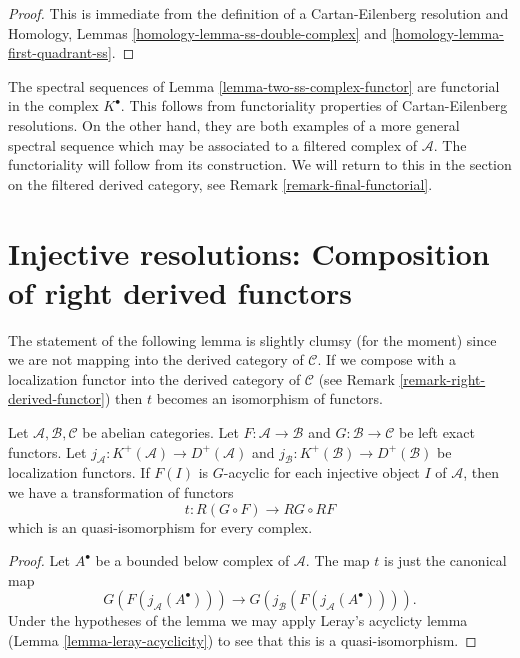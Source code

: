 \begin{proof}
This is immediate from the definition of a Cartan-Eilenberg resolution and
Homology, Lemmas \ref{homology-lemma-ss-double-complex} and
\ref{homology-lemma-first-quadrant-ss}.
\end{proof}

\begin{remark}
\label{remark-functorial-ss}
The spectral sequences of Lemma \ref{lemma-two-ss-complex-functor}
are functorial in the complex $K^\bullet$. This follows from functoriality
properties of Cartan-Eilenberg resolutions. On the other hand, they are
both examples of a more general spectral sequence which may be associated
to a filtered complex of $\mathcal{A}$. The functoriality will follow from
its construction. We will return to this in the section on the filtered
derived category, see Remark \ref{remark-final-functorial}.
\end{remark}










\section{Injective resolutions: Composition of right derived functors}
\label{section-composition-right-derived-functors}

\noindent
The statement of the following lemma is slightly clumsy (for the moment)
since we are not mapping into the derived category of $\mathcal{C}$.
If we compose with a localization functor into the derived category
of $\mathcal{C}$ (see Remark \ref{remark-right-derived-functor})
then $t$ becomes an isomorphism of functors.

\begin{lemma}
\label{lemma-compose-derived-functors}
Let $\mathcal{A}, \mathcal{B}, \mathcal{C}$ be abelian categories.
Let $F : \mathcal{A} \to \mathcal{B}$
and $G : \mathcal{B} \to \mathcal{C}$ be left exact functors.
Let $j_{\mathcal{A}} : K^{+}(\mathcal{A}) \to D^{+}(\mathcal{A})$ and
$j_{\mathcal{B}} : K^{+}(\mathcal{B}) \to D^{+}(\mathcal{B})$ be
localization functors. If $F(I)$ is $G$-acyclic for each injective object $I$
of $\mathcal{A}$, then we have a transformation of functors
$$
t : R(G \circ F) \longrightarrow RG \circ RF
$$
which is an quasi-isomorphism for every complex.
\end{lemma}

\begin{proof}
Let $A^\bullet$ be a bounded below complex of $\mathcal{A}$.
The map $t$ is just the canonical map
$$
G(F(j_{\mathcal{A}}(A^\bullet)))
\longrightarrow
G(j_{\mathcal{B}}(F(j_{\mathcal{A}}(A^\bullet)))).
$$
Under the hypotheses of the lemma we may apply
Leray's acyclicty lemma (Lemma \ref{lemma-leray-acyclicity})
to see that this is a quasi-isomorphism.
\end{proof}

